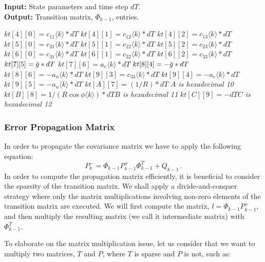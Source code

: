 \documentclass[journal]{IEEEtran}
\begin{document}
\begin{algorithm}[!]
\caption{Computation of transition matrix elements}
 \hspace*{\algorithmicindent} \textbf{Input:} State parameters and time step $dT$.\\
 \hspace*{\algorithmicindent} \textbf{Output:} Transition matrix, $\Phi_{k-1}$, entries.
\begin{algorithmic}[1]
\State $kt[4][0]= c_{11}\langle k\rangle *dT$
\State $kt[4][1]= c_{12}\langle k\rangle *dT$
\State $kt[4][2]= c_{13}\langle k\rangle *dT$
\State $kt[5][0]= c_{21}\langle k\rangle *dT$
\State $kt[5][1]= c_{22}\langle k\rangle *dT$
\State $kt[5][2]= c_{23}\langle k\rangle *dT$
\State $kt[6][0]= c_{31}\langle k\rangle *dT$
\State $kt[6][1]= c_{32}\langle k\rangle *dT$
\State $kt[6][2]= c_{33}\langle k\rangle *dT$
\State $kt[7][5]= \Bar{g}  *dT$
\State $kt[7][6]= a_e\langle k \rangle *dT$
\State $kt[8][4]=-\Bar{g}*dT$
\State $kt[8][6]= -a_n\langle k \rangle *dT$
\State $kt[9][3]=c_{33}\langle k\rangle  *dT$
\State $kt[9][4]= -a_e\langle k \rangle *dT$
\State $kt[9][5]= -a_n\langle k \rangle *dT$
\State $kt[A][7]=(1/R) *dT$ \Comment\textit{$A$ is hexadecimal 10}
\State $kt[B][8]= {1}/{(R\cos\phi\langle k \rangle)} *dT$\Comment\textit{$B$ is hexadecimal 11}
\State $kt[C][9]=  -dT$\Comment\textit{$C$ is hexadecimal 12}
\end{algorithmic}
\label{transitionalg}

\end{algorithm}


%
\subsubsection{Error Propagation Matrix}
In order to propagate the covariance matrix we have to apply the following equation:
\begin{equation}
    P_k^-=\Phi_{k-1} P_{k-1}^+\Phi_{k-1}^T+Q_{k-1}\,.
\end{equation}
In order to compute the propagation matrix efficiently, it is beneficial to consider the sparsity of the transition matrix. We shall apply a divide-and-conquer strategy where only the matrix multiplications involving non-zero elements of the transition matrix are executed. We will first compute the matrix, $l=\Phi_{k-1} P_{k-1}^+$, and then multiply the resulting  matrix (we call it intermediate matrix) with $\Phi_{k-1}^T$.\par
To elaborate on the matrix multiplication issue, let us consider that we want to multiply two matrices, $T$ and $P$, where $T$ is sparse and $P$ is not, such as:
\end{document}
